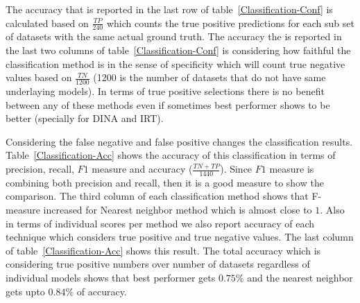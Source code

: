 The accuracy that is reported in the last row of table~\ref{Classification-Conf} is calculated based on $\frac{TP}{240}$ which counts the true positive predictions for each sub set of datasets with the same actual ground truth. The accuracy the is reported in the last two columns of table~\ref{Classification-Conf} is considering how faithful the classification method is in the sense of specificity which will count true negative values based on $\frac{TN}{1200}$ (1200 is the number of datasets that do not have same underlaying models). In terms of true positive selections there is no benefit between any of these methods even if sometimes best performer shows to be better (specially for DINA and IRT).

Considering the false negative and false positive changes the classification results. Table~\ref{Classification-Acc} shows the accuracy of this classification in terms of precision, recall, $F1$ measure and accuracy ($\frac{TN+TP}{1440}$). Since $F1$ measure is combining both precision and recall, then it is a good measure to show the comparison. The third column of each classification method shows that F-measure increased for Nearest neighbor method which is almost close to $1$. Also in terms of individual scores per method we also report accuracy of each technique which considers true positive and true negative values. The last column of table~\ref{Classification-Acc} shows this result. The total accuracy which is considering true positive numbers over number of datasets regardless of individual models shows that best performer  gets $0.75\%$ and the nearest neighbor gets upto $0.84\%$ of accuracy.


